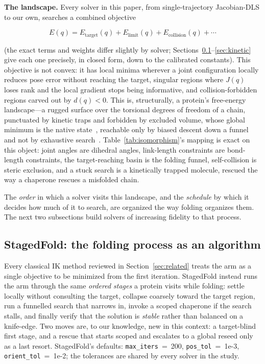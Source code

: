 \documentclass[10pt,conference]{IEEEtran}
\newcommand{\Etgt}{E_{\mathrm{target}}}
\newcommand{\Elim}{E_{\mathrm{limit}}}
\newcommand{\Ecol}{E_{\mathrm{collision}}}
\begin{document}
\textbf{The landscape.} Every solver in this paper, from single-trajectory
Jacobian-DLS to our own, searches a combined objective

\begin{equation}
E(q) = \Etgt(q) + \Elim(q) + \Ecol(q) + \cdots
\label{eq:landscape}
\end{equation}

(the exact terms and weights differ slightly by solver;
Sections~\ref{sec:staged}--\ref{sec:kinetic} give each one precisely, in closed
form, down to the calibrated constants). This objective is not convex: it has
local minima wherever a joint configuration locally reduces pose error without
reaching the target, singular regions where $J(q)$ loses rank and the local
gradient stops being informative, and collision-forbidden regions carved out by
$d(q) < 0$. This is, structurally, a protein's free-energy landscape---a rugged
surface over the torsional degrees of freedom of a chain, punctuated by kinetic
traps and forbidden by excluded volume, whose global minimum is the native
state~\cite{b23}, reachable only by biased descent down a funnel and not by
exhaustive search~\cite{b24,b25}. Table~\ref{tab:isomorphism}'s mapping is exact
on this object: joint angles are dihedral angles, link-length constraints are
bond-length constraints, the target-reaching basin is the folding funnel,
self-collision is steric exclusion, and a stuck search is a kinetically trapped
molecule, rescued the way a chaperone rescues a misfolded chain.

The \emph{order} in which a solver visits this landscape, and the \emph{schedule}
by which it decides how much of it to search, are organized the way folding
organizes them. The next two subsections build solvers of increasing fidelity to
that process.

\subsection{StagedFold: the folding process as an algorithm}
\label{sec:staged}

Every classical IK method reviewed in Section~\ref{sec:related} treats the arm
as a single objective to be minimized from the first iteration. StagedFold
instead runs the arm through the same \emph{ordered stages} a protein visits
while folding: settle locally without consulting the target, collapse coarsely
toward the target region, run a funnelled search that narrows in, invoke a
scoped chaperone if the search stalls, and finally verify that the solution is
\emph{stable} rather than balanced on a knife-edge. Two moves are, to our
knowledge, new in this context: a target-blind first stage, and a rescue that
starts scoped and escalates to a global reseed only as a last resort.
StagedFold's defaults: \texttt{max\_iters}~=~200, \texttt{pos\_tol}~=~1e-3,
\texttt{orient\_tol}~=~1e-2; the tolerances are shared by every solver in the
study.
\end{document}
